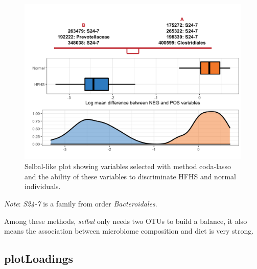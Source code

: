 \documentclass[openany]{book}
\newenvironment{Shaded}{\begin{snugshade}}{\end{snugshade}}
\newcommand{\KeywordTok}[1]{\textcolor[rgb]{0.13,0.29,0.53}{\textbf{#1}}}
\newcommand{\DataTypeTok}[1]{\textcolor[rgb]{0.13,0.29,0.53}{#1}}
\newcommand{\StringTok}[1]{\textcolor[rgb]{0.31,0.60,0.02}{#1}}
\newcommand{\CommentTok}[1]{\textcolor[rgb]{0.56,0.35,0.01}{\textit{#1}}}
\newcommand{\OperatorTok}[1]{\textcolor[rgb]{0.81,0.36,0.00}{\textbf{#1}}}
\newcommand{\NormalTok}[1]{#1}
\begin{document}
\begin{figure}

{\centering \includegraphics[width=1\linewidth]{./Generated_plots/unnamed-chunk-57-1} 

}

\caption{Selbal-like plot showing variables selected with method coda-lasso and the ability of these variables to discriminate HFHS and normal individuals.}\label{fig:unnamed-chunk-57}
\end{figure}

\emph{Note}: \emph{S24-7} is a family from order \emph{Bacteroidales}.

Among these methods, \emph{selbal} only needs two OTUs to build a
balance, it also means the association between microbiome composition
and diet is very strong.

\subsection{plotLoadings}\label{plotloadings-1}

\begin{Shaded}
\end{Shaded}
\end{document}
